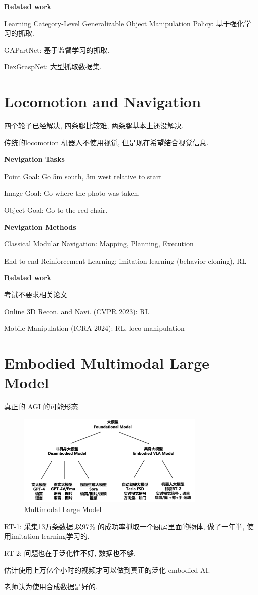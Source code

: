 \textbf{Related work}

Learning Category-Level Generalizable Object Manipulation Policy: 基于强化学习的抓取.

GAPartNet: 基于监督学习的抓取.

DexGraspNet: 大型抓取数据集.

\section{Locomotion and Navigation}

四个轮子已经解决, 四条腿比较难, 两条腿基本上还没解决.

传统的locomotion 机器人不使用视觉, 但是现在希望结合视觉信息.

\textbf{Nevigation Tasks}

Point Goal: Go 5m south, 3m west relative to start

Image Goal: Go where the photo was taken.

Object Goal: Go to the red chair.

\textbf{Nevigation Methods}

Classical Modular Navigation: Mapping, Planning, Execution

End-to-end Reinforcement Learning: imitation learning (behavior cloning), RL

\textbf{Related work}

考试不要求相关论文

Online 3D Recon. and Navi. (CVPR 2023): RL

Mobile Manipulation (ICRA 2024): RL, loco-manipulation

\section{Embodied Multimodal Large Model}

真正的 AGI 的可能形态.

\begin{figure}[htbp]
    \centering
    \includegraphics[width=0.8\textwidth]{figures/Embodied_Multimodal_Large_Model.png}
    \caption{Multimodal Large Model}
\end{figure}

RT-1: 采集13万条数据,以97\% 的成功率抓取一个厨房里面的物体, 做了一年半, 使用imitation learning学习的.

RT-2: 问题也在于泛化性不好, 数据也不够.

估计使用上万亿个小时的视频才可以做到真正的泛化 embodied AI.

老师认为使用合成数据是好的.
